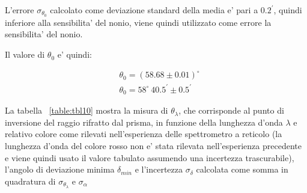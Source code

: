 L'errore $\sigma_{\theta_0}$ calcolato come deviazione standard della media e' pari a $0.2^{\prime}$, quindi inferiore alla sensibilita' del nonio, viene quindi utilizzato come errore la sensibilita' del nonio.

Il valore di $\theta_0$ e' quindi:

    \begin{align*}
        &\theta_0 = (58.68 \pm 0.01)^{\circ} \\
        &\theta_0 = 58^{\circ} \ 40.5^{\prime} \pm 0.5^{\prime}
    \end{align*}


La tabella ~\ref{table:tbl10} mostra la misura di $\theta_{\lambda}$, che corrisponde al punto di inversione del raggio rifratto dal prisma, in funzione della lunghezza d'onda $\lambda$ e relativo colore come rilevati nell'esperienza delle spettrometro a reticolo (la lunghezza d'onda del colore rosso non e' stata rilevata nell'esperienza precedente e viene quindi usato il valore tabulato assumendo una incertezza trascurabile), l'angolo di deviazione minima $\delta_{min}$ e l'incertezza $\sigma_{\delta}$ calcolata come somma in quadratura di $\sigma_{\theta_{\lambda}}$ e $\sigma_{\alpha}$

